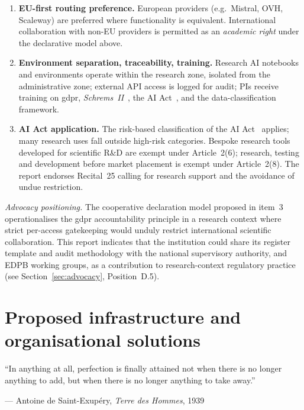 \begin{enumerate}[nosep]
    \item \textbf{EU-first routing preference.} European providers
    (e.g.\ Mistral, OVH, Scaleway) are preferred where functionality
    is equivalent. International collaboration with non-EU providers
    is permitted as an \emph{academic right} under the declarative
    model above.

    \item \textbf{Environment separation, traceability, training.}
    Research AI notebooks and environments operate within the
    research zone, isolated from the administrative zone; external
    API access is logged for audit; PIs receive training on
    \gls{gdpr}, \emph{Schrems~II}~\cite{schrems2020}, the AI
    Act~\cite{eu-ai-act}, and the data-classification framework.

    \item \textbf{AI Act application.} The risk-based classification
    of the AI Act~\cite{eu-ai-act} applies; many research uses fall
    outside high-risk categories. Bespoke research tools developed
    for scientific R\&D are exempt under Article~2(6); research,
    testing and development before market placement is exempt under
    Article~2(8). The report endorses Recital~25 calling for research
    support and the avoidance of undue restriction.
\end{enumerate}

\medskip
\noindent\textit{Advocacy positioning.} The cooperative declaration
model proposed in item~3 operationalises the \gls{gdpr} accountability
principle in a research context where strict per-access gatekeeping
would unduly restrict international scientific collaboration. This
report indicates that the institution could share its register
template and audit methodology with the national supervisory
authority,  and EDPB working
groups, as a contribution to
research-context regulatory practice (see
Section~\ref{sec:advocacy}, Position~D.5).

\section{Proposed infrastructure and organisational solutions}
\label{sec:propositions-infra}

\epigraph{``In anything at all, perfection is finally attained not when there is no longer anything to add, but when there is no longer anything to take away.''}{--- Antoine de Saint-Exup\'ery, \textit{Terre des Hommes}, 1939~\cite{saintexupery1939}}

